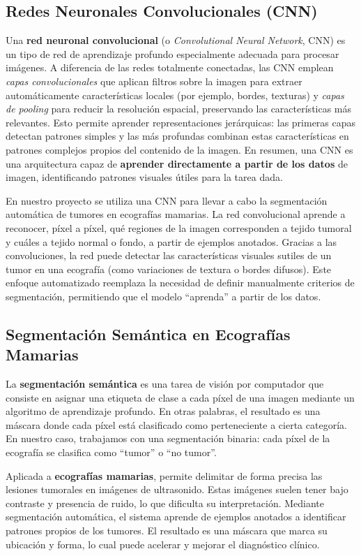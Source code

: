 \documentclass[12pt]{article}
\begin{document}
\subsection{Redes Neuronales Convolucionales (CNN)} 
Una \textbf{red neuronal convolucional} (o \textit{Convolutional Neural Network}, CNN) es un tipo de red de aprendizaje profundo especialmente adecuada para procesar imágenes. A diferencia de las redes totalmente conectadas, las CNN emplean \textit{capas convolucionales} que aplican filtros sobre la imagen para extraer automáticamente características locales (por ejemplo, bordes, texturas) y \textit{capas de pooling} para reducir la resolución espacial, preservando las características más relevantes. Esto permite aprender representaciones jerárquicas: las primeras capas detectan patrones simples y las más profundas combinan estas características en patrones complejos propios del contenido de la imagen. En resumen, una CNN es una arquitectura capaz de \textbf{aprender directamente a partir de los datos} de imagen, identificando patrones visuales útiles para la tarea dada.\cite{goodfellow2016deep}

En nuestro proyecto se utiliza una CNN para llevar a cabo la segmentación automática de tumores en ecografías mamarias. La red convolucional aprende a reconocer, píxel a píxel, qué regiones de la imagen corresponden a tejido tumoral y cuáles a tejido normal o fondo, a partir de ejemplos anotados. Gracias a las convoluciones, la red puede detectar las características visuales sutiles de un tumor en una ecografía (como variaciones de textura o bordes difusos). Este enfoque automatizado reemplaza la necesidad de definir manualmente criterios de segmentación, permitiendo que el modelo ``aprenda'' a partir de los datos.

\subsection*{Segmentación Semántica en Ecografías Mamarias}  
La \textbf{segmentación semántica} es una tarea de visión por computador que consiste en asignar una etiqueta de clase a cada píxel de una imagen mediante un algoritmo de aprendizaje profundo. En otras palabras, el resultado es una máscara donde cada píxel está clasificado como perteneciente a cierta categoría. En nuestro caso, trabajamos con una segmentación binaria: cada píxel de la ecografía se clasifica como “tumor” o “no tumor”.\cite{ronneberger2015unet}


Aplicada a \textbf{ecografías mamarias}, permite delimitar de forma precisa las lesiones tumorales en imágenes de ultrasonido. Estas imágenes suelen tener bajo contraste y presencia de ruido, lo que dificulta su interpretación. Mediante segmentación automática, el sistema aprende de ejemplos anotados a identificar patrones propios de los tumores. El resultado es una máscara que marca su ubicación y forma, lo cual puede acelerar y mejorar el diagnóstico clínico.
\end{document}
